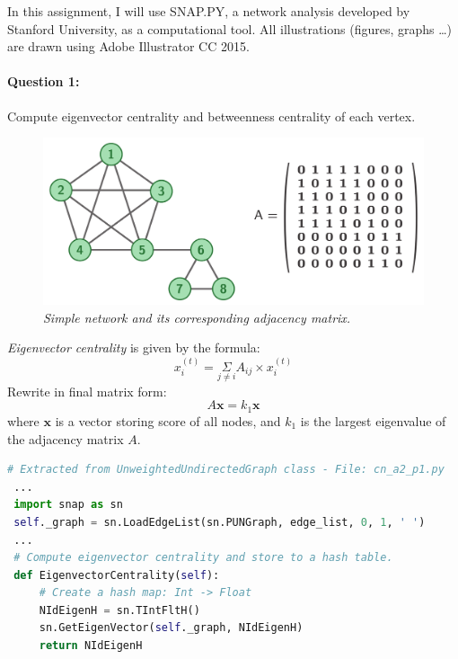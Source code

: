 \documentclass[a4paper,12pt]{article}
\begin{document}
\noindent
In this assignment, I will use SNAP.PY, a network analysis developed by Stanford University, as a computational tool. All illustrations (figures, graphs \ldots) are drawn using Adobe Illustrator CC 2015.

\paragraph{Question 1:} Compute eigenvector centrality and betweenness centrality of each vertex.

\begin{figure}[h]
    \includegraphics[width=\textwidth]{cn_a2_net}
    \caption{\emph{Simple network and its corresponding adjacency matrix.}}
    \label{fig:net}
\end{figure}

\noindent
\emph{Eigenvector centrality} is given by the formula:
$$ x_i^{(t)}= \underset{j \neq i}{\Sigma} A_{ij} \times x_i^{(t)} $$
Rewrite in final matrix form:
$$ A\boldsymbol{x} = k_1\boldsymbol{x} $$
where $\boldsymbol{x}$ is a vector storing score of all nodes, and $k_1$ is the largest eigenvalue of the adjacency matrix $A$.

\begin{lstlisting}[language=Python, caption={Eigenvector centrality computation with SNAP.PY}, label={lst:eig}]
 # Extracted from UnweightedUndirectedGraph class - File: cn_a2_p1.py
 ...
 import snap as sn
 self._graph = sn.LoadEdgeList(sn.PUNGraph, edge_list, 0, 1, ' ')
 ...
 # Compute eigenvector centrality and store to a hash table.
 def EigenvectorCentrality(self):
     # Create a hash map: Int -> Float
     NIdEigenH = sn.TIntFltH()
     sn.GetEigenVector(self._graph, NIdEigenH)
     return NIdEigenH
\end{lstlisting}

\pagebreak
\end{document}
